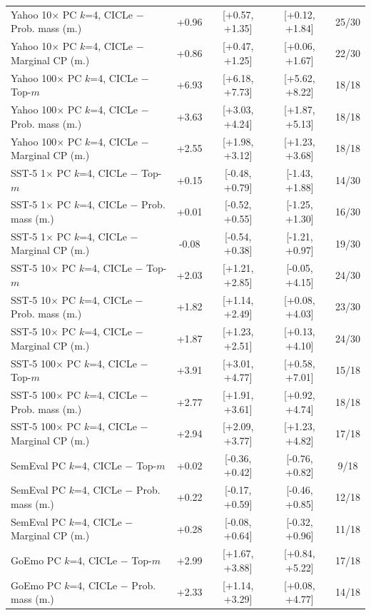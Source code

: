 \begin{tabular}{lcccc}
Yahoo 10$\times$ PC $k$=4, CICLe $-$ Prob. mass (m.) & +0.96 & [+0.57, +1.35] & [+0.12, +1.84] & 25/30 \\
Yahoo 10$\times$ PC $k$=4, CICLe $-$ Marginal CP (m.) & +0.86 & [+0.47, +1.25] & [+0.06, +1.67] & 22/30 \\
Yahoo 100$\times$ PC $k$=4, CICLe $-$ Top-$m$ & +6.93 & [+6.18, +7.73] & [+5.62, +8.22] & 18/18 \\
Yahoo 100$\times$ PC $k$=4, CICLe $-$ Prob. mass (m.) & +3.63 & [+3.03, +4.24] & [+1.87, +5.13] & 18/18 \\
Yahoo 100$\times$ PC $k$=4, CICLe $-$ Marginal CP (m.) & +2.55 & [+1.98, +3.12] & [+1.23, +3.68] & 18/18 \\
SST-5 1$\times$ PC $k$=4, CICLe $-$ Top-$m$ & +0.15 & [-0.48, +0.79] & [-1.43, +1.88] & 14/30 \\
SST-5 1$\times$ PC $k$=4, CICLe $-$ Prob. mass (m.) & +0.01 & [-0.52, +0.55] & [-1.25, +1.30] & 16/30 \\
SST-5 1$\times$ PC $k$=4, CICLe $-$ Marginal CP (m.) & -0.08 & [-0.54, +0.38] & [-1.21, +0.97] & 19/30 \\
SST-5 10$\times$ PC $k$=4, CICLe $-$ Top-$m$ & +2.03 & [+1.21, +2.85] & [-0.05, +4.15] & 24/30 \\
SST-5 10$\times$ PC $k$=4, CICLe $-$ Prob. mass (m.) & +1.82 & [+1.14, +2.49] & [+0.08, +4.03] & 23/30 \\
SST-5 10$\times$ PC $k$=4, CICLe $-$ Marginal CP (m.) & +1.87 & [+1.23, +2.51] & [+0.13, +4.10] & 24/30 \\
SST-5 100$\times$ PC $k$=4, CICLe $-$ Top-$m$ & +3.91 & [+3.01, +4.77] & [+0.58, +7.01] & 15/18 \\
SST-5 100$\times$ PC $k$=4, CICLe $-$ Prob. mass (m.) & +2.77 & [+1.91, +3.61] & [+0.92, +4.74] & 18/18 \\
SST-5 100$\times$ PC $k$=4, CICLe $-$ Marginal CP (m.) & +2.94 & [+2.09, +3.77] & [+1.23, +4.82] & 17/18 \\
SemEval PC $k$=4, CICLe $-$ Top-$m$ & +0.02 & [-0.36, +0.42] & [-0.76, +0.82] & 9/18 \\
SemEval PC $k$=4, CICLe $-$ Prob. mass (m.) & +0.22 & [-0.17, +0.59] & [-0.46, +0.85] & 12/18 \\
SemEval PC $k$=4, CICLe $-$ Marginal CP (m.) & +0.28 & [-0.08, +0.64] & [-0.32, +0.96] & 11/18 \\
GoEmo PC $k$=4, CICLe $-$ Top-$m$ & +2.99 & [+1.67, +3.88] & [+0.84, +5.22] & 17/18 \\
GoEmo PC $k$=4, CICLe $-$ Prob. mass (m.) & +2.33 & [+1.14, +3.29] & [+0.08, +4.77] & 14/18 \\

\end{tabular}
